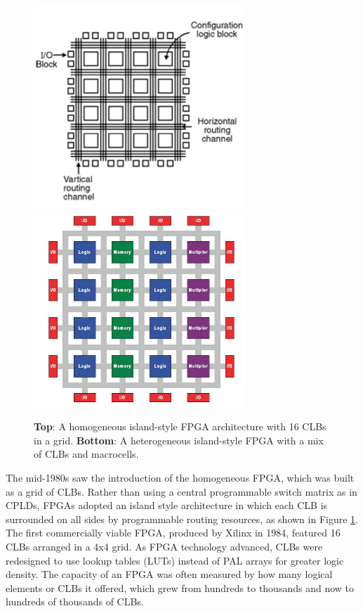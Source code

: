 \documentclass[twocolumn]{article}
\begin{document}
    \begin{figure}
        \centering
        \includegraphics[width=8.0cm]{figures/homogenous_fpga.png}
        \includegraphics[width=8.0cm]{figures/heterogenous_fpga_3.jpg}
        \caption{
            \textbf{Top}: A homogeneous island-style FPGA architecture with 16 CLBs in a grid. 
            \textbf{Bottom}: A heterogeneous island-style FPGA with a mix of CLBs and macrocells.
        }
        \label{fig:fpga}
    \end{figure}

    The mid-1980s saw the introduction of the homogeneous FPGA, which was built as a grid of CLBs. 
    Rather than using a central programmable switch matrix as in CPLDs, FPGAs adopted an island style architecture in which each CLB is surrounded on all sides by programmable routing resources, as shown in Figure \ref{fig:fpga}. 
    The first commercially viable FPGA, produced by Xilinx in 1984, featured 16 CLBs arranged in a 4x4 grid. 
    As FPGA technology advanced, CLBs were redesigned to use lookup tables (LUTs) instead of PAL arrays for greater logic density. 
    The capacity of an FPGA was often measured by how many logical elements or CLBs it offered, which grew from hundreds to thousands and now to hundreds of thousands of CLBs.
\end{document}
